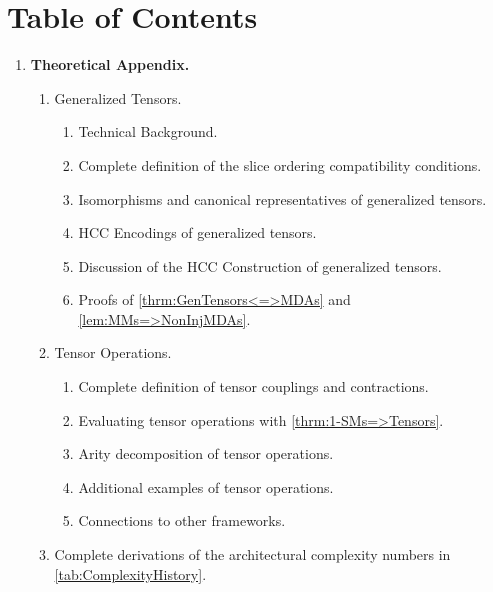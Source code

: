 \documentclass{article}
\theoremstyle{plain}
\theoremstyle{definition}
\theoremstyle{remark}
\begin{document}
\section*{Table of Contents}
\begin{enumerate}
	\item [A] \textbf{Theoretical Appendix.}
	\begin{enumerate}
		\item[\textbf{\ref{sec:GenTens_Apdx}}] Generalized Tensors.
		\begin{enumerate}
			\item[\ref{sec:Machinery_Apdx}] Technical Background.
			\item[\ref{sec:GenTenSOCC_Apdx}] Complete definition of the slice ordering compatibility conditions.
			\item[\ref{sec:GenTenIsos_Apdx}] Isomorphisms and canonical representatives of generalized tensors.
			\item[\ref{sec:GenTenHCCs_Apdx}] HCC Encodings of generalized tensors.
			\item[\ref{sec:GenTenDisc_Apdx}] Discussion of the HCC Construction of generalized tensors.
			\item[\ref{sec:GenTenProofs_Apdx}] Proofs of \cref{thrm:GenTensors<=>MDAs} and \cref{lem:MMs=>NonInjMDAs}.
		\end{enumerate}
		\item[\textbf{\ref{sec:TensorOps}}] Tensor Operations.
		\begin{enumerate}
			\item[\ref{sec:TensorOps_Defs}] Complete definition of tensor couplings and contractions.
			\item[\ref{sec:TensorOps_Eval}] Evaluating tensor operations with \cref{thrm:1-SMs=>Tensors}.
			\item[\ref{sec:TensorOps_Decomp}] Arity decomposition of tensor operations.
			\item[\ref{sec:TensorOps_Examples}] Additional examples of tensor operations.
			\item[\ref{sec:TensorOps_Connections}] Connections to other frameworks.
		\end{enumerate}
		\item[\textbf{\ref{sec:ArchDerivs}}] Complete derivations of the architectural complexity numbers in \cref{tab:ComplexityHistory}.
	\end{enumerate}
	

\end{enumerate}
\end{document}
